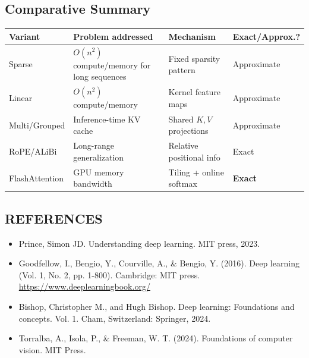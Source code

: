 \documentclass[11pt]{article}
\begin{document}
\subsection*{Comparative Summary}

\begin{center}
\renewcommand{\arraystretch}{1.35}
\begin{tabular}{|l|p{3.2cm}|p{3.4cm}|p{2.8cm}|}
\hline
\textbf{Variant} & \textbf{Problem addressed} & \textbf{Mechanism} & \textbf{Exact/Approx.?} \\
\hline
Sparse & $O(n^2)$ compute/memory for long sequences & Fixed sparsity pattern & Approximate \\
Linear & $O(n^2)$ compute/memory & Kernel feature maps & Approximate \\
Multi/Grouped & Inference-time KV cache & Shared $K,V$ projections & Approximate \\
RoPE/ALiBi & Long-range generalization & Relative positional info & Exact \\
FlashAttention & GPU memory bandwidth & Tiling + online softmax & \textbf{Exact} \\
\hline
\end{tabular}
\end{center}

\subsection*{REFERENCES}
\begin{itemize}
    \item Prince, Simon JD. Understanding deep learning. MIT press, 2023.
    \item Goodfellow, I., Bengio, Y., Courville, A., \& Bengio, Y. (2016). Deep learning (Vol. 1, No. 2, pp. 1-800). Cambridge: MIT press. \url{https://www.deeplearningbook.org/}
    \item Bishop, Christopher M., and Hugh Bishop. Deep learning: Foundations and concepts. Vol. 1. Cham, Switzerland: Springer, 2024.
    \item Torralba, A., Isola, P., \& Freeman, W. T. (2024). Foundations of computer vision. MIT Press.
\end{itemize}
\end{document}
